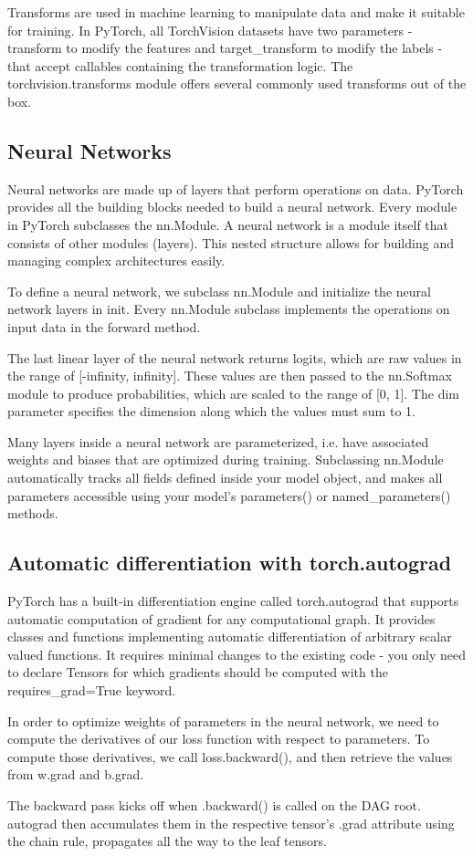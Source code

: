 Transforms are used in machine learning to manipulate data and make it suitable for training.
In PyTorch, all TorchVision datasets have two parameters - transform to modify the features and target\_transform to modify the labels - that accept callables containing the transformation logic.
The torchvision.transforms module offers several commonly used transforms out of the box.


\subsection{Neural Networks}
Neural networks are made up of layers that perform operations on data.
PyTorch provides all the building blocks needed to build a neural network.
Every module in PyTorch subclasses the nn.Module.
A neural network is a module itself that consists of other modules (layers).
This nested structure allows for building and managing complex architectures easily.

To define a neural network, we subclass nn.Module and initialize the neural network layers in init.
Every nn.Module subclass implements the operations on input data in the forward method.

The last linear layer of the neural network returns logits, which are raw values in the range of [-infinity, infinity].
These values are then passed to the nn.Softmax module to produce probabilities, which are scaled to the range of [0, 1].
The dim parameter specifies the dimension along which the values must sum to 1.

Many layers inside a neural network are parameterized, i.e. have associated weights and biases that are optimized during training.
Subclassing nn.Module automatically tracks all fields defined inside your model object, and makes all parameters accessible using your model's parameters() or named\_parameters() methods.


\subsection{Automatic differentiation with torch.autograd}
PyTorch has a built-in differentiation engine called torch.autograd that supports automatic computation of gradient for any computational graph.
It provides classes and functions implementing automatic differentiation of arbitrary scalar valued functions.
It requires minimal changes to the existing code - you only need to declare Tensors for which gradients should be computed with the requires\_grad=True keyword.

In order to optimize weights of parameters in the neural network, we need to compute the derivatives of our loss function with respect to parameters.
To compute those derivatives, we call loss.backward(), and then retrieve the values from w.grad and b.grad.

The backward pass kicks off when .backward() is called on the DAG root. autograd then accumulates them in the respective tensor's .grad attribute using the chain rule, propagates all the way to the leaf tensors.
